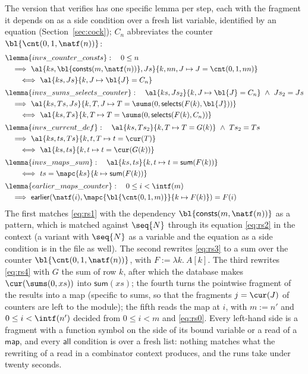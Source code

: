 The version that verifies has one specific lemma per step, each with the fragment it depends on as a side
condition over a fresh list variable, identified by an equation (Section~\ref{sec:cock}); $C_n$ abbreviates
the counter $\bl{\cnt(0, 1, \natf(n))}$:
\begin{align*}
  &\lemma{invs\_counter\_consts}:\quad 0 \le n\\
  &\quad\Longrightarrow\ \al{ks, \bl{\mathsf{consts}(m, \natf(n))}, Js}{k, nn, J \mapsto J = \cnt(0, 1, nn)}\\
  &\qquad\Longleftrightarrow\ \al{ks, Js}{k, J \mapsto \bl{J} = C_n}\\[2pt]
  &\lemma{invs\_sums\_selects\_counter}:\quad \al{ks, Js_2}{k, J \mapsto \bl{J} = C_n}\ \wedge\ Js_2 = Js\\
  &\quad\Longrightarrow\ \al{ks, Ts, Js}{k, T, J \mapsto T = \sums(0, \mathsf{selects}(F(k), \bl{J}))}\\
  &\qquad\Longleftrightarrow\ \al{ks, Ts}{k, T \mapsto T = \sums(0, \mathsf{selects}(F(k), C_n))}\\[2pt]
  &\lemma{invs\_current\_def}:\quad \al{ks, Ts_2}{k, T \mapsto T = G(k)}\ \wedge\ Ts_2 = Ts\\
  &\quad\Longrightarrow\ \al{ks, ts, Ts}{k, t, T \mapsto t = \cur(T)}\\
  &\qquad\Longleftrightarrow\ \al{ks, ts}{k, t \mapsto t = \cur(G(k))}\\[2pt]
  &\lemma{invs\_maps\_sum}:\quad \al{ks, ts}{k, t \mapsto t = \mathsf{sum}(F(k))}\\
  &\qquad\Longleftrightarrow\ ts = \mapc{ks}{k \mapsto \mathsf{sum}(F(k))}\\[2pt]
  &\lemma{earlier\_maps\_counter}:\quad 0 \le i < \intf(m)\\
  &\quad\Longrightarrow\ \mathsf{earlier}(\natf(i), \mapc{\bl{\cnt(0, 1, m)}}{k \mapsto F(k)}) = F(i)
\end{align*}
The first matches \eqref{eq:rs1} with the dependency $\bl{\mathsf{consts}(m, \natf(n))}$ as a pattern,
which is matched against $\seq{N}$ through its equation \eqref{eq:rs2} in the context (a variant with
$\seq{N}$ as a variable and the equation as a side condition is in the file as well). The second rewrites
\eqref{eq:rs3} to a sum over the counter $\bl{\cnt(0, 1, \natf(n))}$, with $F := \lambda k.\ A[k]$. The third
rewrites \eqref{eq:rs4} with $G$ the sum of row $k$, after which the database makes $\cur(\sums(0, xs))$ into
$\mathsf{sum}(xs)$; the fourth turns the pointwise fragment of the results
into a map (specific to sums, so that the fragments $j = \cur(J)$ of counters are left to the module); the
fifth reads the map at $i$, with $m := n'$ and $0 \le i < \intf(n')$ decided from $0 \le i < m$ and
\eqref{eq:rs0}. Every left-hand side is a fragment with a function symbol on the side of its bound variable
or a read of a $\mathsf{map}$, and every $\mathsf{all}$ condition is over a fresh list: nothing matches what
the rewriting of a read in a combinator context produces, and the runs take under twenty seconds.


